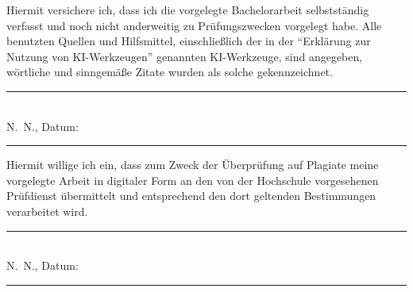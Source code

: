 \documentclass[12pt,twoside=false,a4paper,parskip]{scrbook}
\def\BaAuthor{Serhii Radkovskyi}
\def\BaDeadline{\rule{25mm}{0.4pt}}
\def\ShowBaAuthor{\BaAuthor}
\def\ShowBaAuthor{N.~N.}
\begin{document}

Hiermit versichere ich, dass ich die vorgelegte Bachelorarbeit selbstständig verfasst und noch nicht anderweitig zu Prüfungszwecken vorgelegt habe. Alle benutzten Quellen und Hilfsmittel, einschließlich der in der \enquote{Erklärung zur Nutzung von KI-Werkzeugen} genannten KI-Werkzeuge, sind angegeben, wörtliche und sinngemäße Zitate wurden als solche gekennzeichnet.

\vspace{20pt}
\begin{flushright}
  \rule{0.75\linewidth}{0.4pt}\\[5pt]
  \ShowBaAuthor, Datum: \BaDeadline
\end{flushright}


Hiermit willige ich ein, dass zum Zweck der Überprüfung auf Plagiate meine vorgelegte Arbeit in digitaler Form an den von der Hochschule vorgesehenen Prüfdienst übermittelt und entsprechend den dort geltenden Bestimmungen verarbeitet wird.

\vspace{20pt}
\begin{flushright}
  \rule{0.75\linewidth}{0.4pt}\\[5pt]
  \ShowBaAuthor, Datum: \BaDeadline
\end{flushright}
\end{document}

